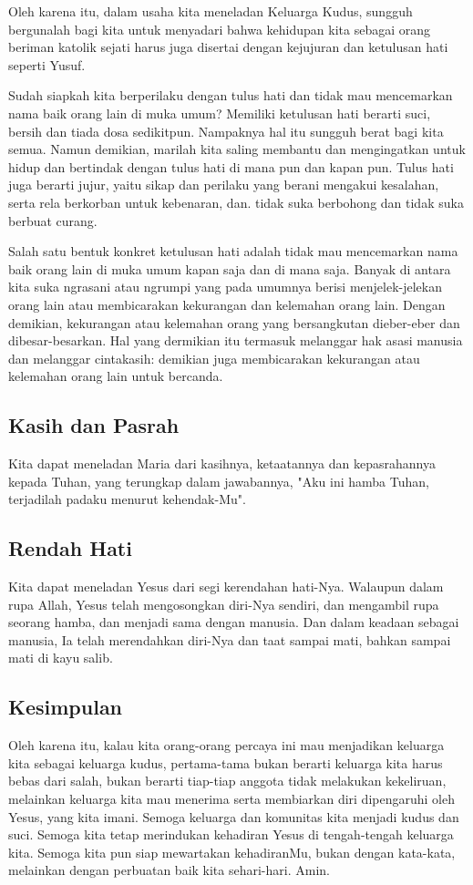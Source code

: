 \documentclass[12pt,a4paper]{article}
\begin{document}
Oleh karena itu, dalam usaha kita meneladan Keluarga Kudus, sungguh bergunalah bagi kita untuk menyadari bahwa kehidupan kita sebagai orang beriman katolik sejati harus juga disertai dengan kejujuran dan ketulusan hati seperti Yusuf.

Sudah siapkah kita berperilaku dengan tulus hati dan tidak mau mencemarkan nama baik orang lain di muka umum? Memiliki ketulusan hati berarti suci, bersih dan tiada dosa sedikitpun. Nampaknya hal itu sungguh berat bagi kita semua. Namun demikian, marilah kita saling membantu dan mengingatkan untuk hidup dan bertindak dengan tulus hati di mana pun dan kapan pun. Tulus hati juga berarti jujur, yaitu sikap dan perilaku yang berani mengakui kesalahan, serta rela berkorban untuk kebenaran, dan. tidak suka berbohong dan tidak suka berbuat curang.

Salah satu bentuk konkret ketulusan hati adalah tidak mau mencemarkan nama baik orang lain di muka umum kapan saja dan di mana saja. Banyak di antara kita suka ngrasani atau ngrumpi yang pada umumnya berisi menjelek-jelekan orang lain atau membicarakan kekurangan dan kelemahan orang lain. Dengan demikian, kekurangan atau kelemahan orang yang bersangkutan dieber-eber dan dibesar-besarkan. Hal yang dermikian itu termasuk melanggar hak asasi manusia dan melanggar cintakasih: demikian juga membicarakan kekurangan atau kelemahan orang lain untuk bercanda.


\subsection*{Kasih dan Pasrah}
Kita dapat meneladan Maria dari kasihnya, ketaatannya dan kepasrahannya kepada Tuhan, yang terungkap dalam jawabannya, "Aku ini hamba Tuhan, terjadilah padaku menurut kehendak-Mu".

\subsection*{Rendah Hati}
Kita dapat meneladan Yesus dari segi kerendahan hati-Nya. Walaupun dalam rupa Allah, Yesus telah mengosongkan diri-Nya sendiri, dan mengambil rupa seorang hamba, dan menjadi sama dengan manusia. Dan dalam keadaan sebagai manusia, Ia telah merendahkan diri-Nya dan taat sampai mati, bahkan sampai mati di kayu salib.

\subsection*{Kesimpulan}
Oleh karena itu, kalau kita orang-orang percaya ini mau menjadikan keluarga kita sebagai keluarga kudus, pertama-tama bukan berarti keluarga kita harus bebas dari salah, bukan berarti tiap-tiap anggota tidak melakukan kekeliruan, melainkan keluarga kita mau menerima serta membiarkan diri dipengaruhi oleh Yesus, yang kita imani.
Semoga keluarga dan komunitas kita menjadi kudus dan suci. Semoga kita tetap merindukan kehadiran Yesus di tengah-tengah keluarga kita. Semoga kita pun siap mewartakan kehadiranMu, bukan dengan kata-kata, melainkan dengan perbuatan baik kita sehari-hari. Amin.
\end{document}
